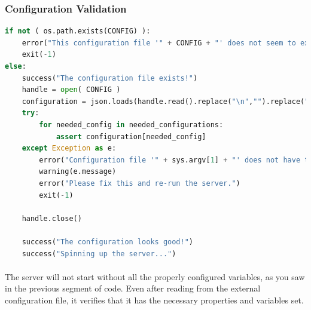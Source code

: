 \documentclass[11pt]{article}
\begin{document}
	\subsubsection{Configuration Validation}


\begin{lstlisting}[language=Python]
if not ( os.path.exists(CONFIG) ):
	error("This configuration file '" + CONFIG + "' does not seem to exist!")
	exit(-1)
else:
	success("The configuration file exists!")
	handle = open( CONFIG )
	configuration = json.loads(handle.read().replace("\n","").replace("\t",""))
	try:
		for needed_config in needed_configurations:
			assert configuration[needed_config]
	except Exception as e:	
		error("Configuration file '" + sys.argv[1] + "' does not have the following configuration tag:")
		warning(e.message)
		error("Please fix this and re-run the server.")
		exit(-1)
	
	handle.close()

	success("The configuration looks good!")
	success("Spinning up the server...")
\end{lstlisting}

	\paragraph{} The server will not start without all the properly configured variables, as you saw in the previous segment of code. Even after reading from the external configuration file, it verifies that it has the necessary properties and variables set.

	\paragraph{}


	\begin{center}
		\graphicspath{ {.} }
		\centering
	\end{center}
	
\end{document}
